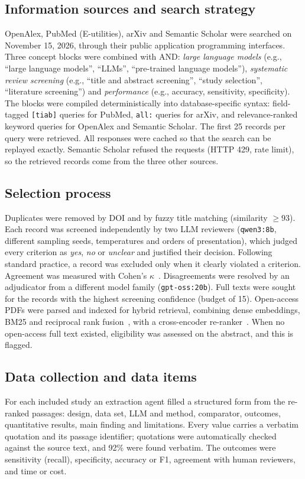 \documentclass[12pt,a4paper]{article}
\begin{document}
\subsection{Information sources and search strategy}
OpenAlex, PubMed (E-utilities), arXiv and Semantic Scholar were searched on November 15, 2026,
through their public application programming interfaces. Three concept blocks were combined with
AND: \emph{large language models} (e.g., ``large language models'', ``LLMs'', ``pre-trained
language models''), \emph{systematic review screening} (e.g., ``title and abstract
screening'', ``study selection'', ``literature screening'') and \emph{performance} (e.g.,
accuracy, sensitivity, specificity). The blocks were compiled deterministically into
database-specific syntax: field-tagged \texttt{[tiab]} queries for PubMed, \texttt{all:} queries
for arXiv, and relevance-ranked keyword queries for OpenAlex and Semantic Scholar. The first
25 records per query were retrieved. All responses were cached so that the search can be
replayed exactly. Semantic Scholar refused the requests (HTTP 429, rate limit), so the
retrieved records come from the three other sources.

\subsection{Selection process}
Duplicates were removed by DOI and by fuzzy title matching (similarity $\geq 93$). Each record
was screened independently by two LLM reviewers (\texttt{qwen3:8b}, different sampling seeds,
temperatures and orders of presentation), which judged every criterion as \emph{yes},
\emph{no} or \emph{unclear} and justified their decision. Following standard practice, a
record was excluded only when it clearly violated a criterion. Agreement was measured with
Cohen's $\kappa$~\cite{cohen}. Disagreements were resolved by an adjudicator from a different
model family (\texttt{gpt-oss:20b}). Full texts were sought for the records with the highest
screening confidence (budget of 15). Open-access PDFs were parsed and indexed for hybrid
retrieval, combining dense embeddings, BM25 and reciprocal rank fusion~\cite{rrf}, with a
cross-encoder re-ranker~\cite{rag}. When no open-access full text existed, eligibility was
assessed on the abstract, and this is flagged.

\subsection{Data collection and data items}
For each included study an extraction agent filled a structured form from the re-ranked
passages: design, data set, LLM and method, comparator, outcomes, quantitative results,
main finding and limitations. Every value carries a verbatim quotation and its passage
identifier; quotations were automatically checked against the source text, and 92\% were found
verbatim. The outcomes were sensitivity (recall), specificity, accuracy or F1, agreement with
human reviewers, and time or cost.
\end{document}
